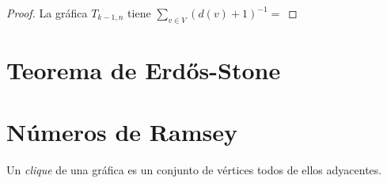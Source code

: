 \begin{proof} %
    La gráfica $T_{k-1, n}$ tiene $\sum_{v \in V}(d(v) + 1)^{-1} = $
\end{proof}
\section{Teorema de Erdős-Stone} %

\section{Números de Ramsey}
Un \textit{clique} de una gráfica es un conjunto de vértices todos de
ellos adyacentes.
